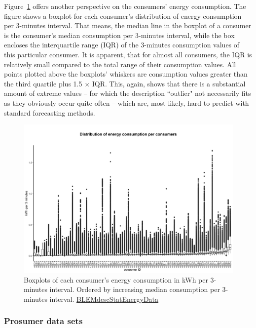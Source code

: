 Figure~\ref{Fig:cons_boxplots_consumption} offers another perspective on the consumers' energy consumption. The figure shows a boxplot for each consumer's distribution of energy consumption per 3-minutes interval. That means, the median line in the boxplot of a consumer is the consumer's median consumption per 3-minutes interval, while the box encloses the interquartile range (IQR) of the 3-minutes consumption values of this particular consumer. It is apparent, that for almost all consumers, the IQR is relatively small compared to the total range of their consumption values. All points plotted above the boxplots' whiskers are consumption values greater than the third quartile plus 1.5 $\times$ IQR. This, again, shows that there is a substantial amount of extreme values -- for which the description ``outlier" not necessarily fits as they obviously occur quite often -- which are, most likely, hard to predict with standard forecasting methods.
%
\begin{figure}[ht]
 \centering
\includegraphics[width=\textwidth]{thesis/graphs/consumer_boxplots_consumption.jpg}
\caption[Boxplots of each consumer's energy consumption in kWh/3-minutes interval]{Boxplots of each consumer's energy consumption in kWh per 3-minutes interval. Ordered by increasing median consumption per 3-minutes interval. \quantnet\href{https://github.com/QuantLet/BLEM/tree/master/BLEMdescStatEnergyData}{BLEMdescStatEnergyData}}
\label{Fig:cons_boxplots_consumption}
\end{figure}



\newpage
\subsubsection{Prosumer data sets}

